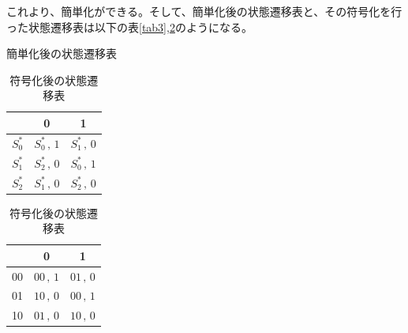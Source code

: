 \documentclass{jsarticle}
\begin{document}
\begin{description}
\begin{description}
            これより、簡単化ができる。そして、簡単化後の状態遷移表と、その符号化を行った状態遷移表は以下の表\ref{tab3},\ref{tab4}のようになる。
            \begin{table}[H]
                \centering
                \begin{minipage}{0.4\columnwidth}
                    \centering
                    \caption{簡単化後の状態遷移表}
                    \label{tab3}
                    \begin{tabular}{|c|c|c|} \hline
                        & 0 & 1 \\ \hline
                        $S_0^*$ & $S_0^* \,,\, 1$ & $S_1^* \,,\, 0$ \\ \hline
                        $S_1^*$ & $S_2^* \,,\, 0$ & $S_0^* \,,\, 1$ \\ \hline
                        $S_2^*$ & $S_1^* \,,\, 0$ & $S_2^* \,,\, 0$ \\ \hline
                    \end{tabular}
                \end{minipage}
                \begin{minipage}{0.4\columnwidth}
                    \centering
                    \caption{符号化後の状態遷移表}
                    \label{tab4}
                    \begin{tabular}{|c|c|c|} \hline
                        & 0 & 1 \\ \hline
                        00 & $00 \,,\, 1$ & $01 \,,\, 0$ \\ \hline
                        01 & $10 \,,\, 0$ & $00 \,,\, 1$ \\ \hline
                        10 & $01 \,,\, 0$ & $10 \,,\, 0$ \\ \hline
                    \end{tabular}
                \end{minipage}
            \end{table}


\end{description}
\end{description}
\end{document}
